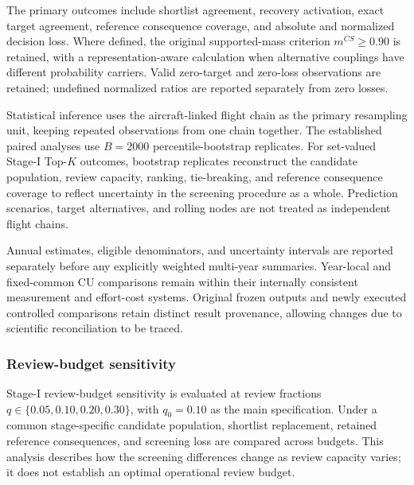 The primary outcomes include shortlist agreement, recovery activation, exact target agreement, reference consequence coverage, and absolute and normalized decision loss. Where defined, the original supported-mass criterion $m^{CS}\geq0.90$ is retained, with a representation-aware calculation when alternative couplings have different probability carriers. Valid zero-target and zero-loss observations are retained; undefined normalized ratios are reported separately from zero losses.

Statistical inference uses the aircraft-linked flight chain as the primary resampling unit, keeping repeated observations from one chain together. The established paired analyses use $B=2000$ percentile-bootstrap replicates. For set-valued Stage-I Top-$K$ outcomes, bootstrap replicates reconstruct the candidate population, review capacity, ranking, tie-breaking, and reference consequence coverage to reflect uncertainty in the screening procedure as a whole. Prediction scenarios, target alternatives, and rolling nodes are not treated as independent flight chains.

Annual estimates, eligible denominators, and uncertainty intervals are reported separately before any explicitly weighted multi-year summaries. Year-local and fixed-common CU comparisons remain within their internally consistent measurement and effort-cost systems. Original frozen outputs and newly executed controlled comparisons retain distinct result provenance, allowing changes due to scientific reconciliation to be traced.

\subsubsection{Review-budget sensitivity}
\label{subsubsec:sensitivity}

Stage-I review-budget sensitivity is evaluated at review fractions $q\in\{0.05,0.10,0.20,0.30\}$, with $q_0=0.10$ as the main specification. Under a common stage-specific candidate population, shortlist replacement, retained reference consequences, and screening loss are compared across budgets. This analysis describes how the screening differences change as review capacity varies; it does not establish an optimal operational review budget.